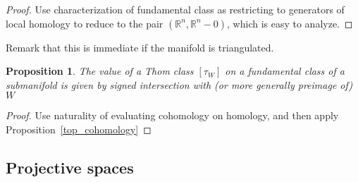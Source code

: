 \documentclass{amsart}          %
\newtheorem{proposition}[theorem]{Proposition}
\newcommand{\R}{\mathbb R}
\begin{document}
\begin{proof}
Use characterization of fundamental class as restricting to generators of local homology to reduce to the pair $(\R^n, \R^n - 0)$,
which is easy to analyze.
\end{proof}

Remark that this is immediate if the manifold is triangulated.

\begin{proposition}
The value of a Thom class $[\tau_W]$ on  a fundamental class of a submanifold is given by signed intersection with 
(or more generally preimage of) $W$
\end{proposition}

\begin{proof}
Use naturality of evaluating cohomology on homology, and then apply Proposition~\ref{top_cohomology}
\end{proof}


\subsection{Projective spaces}
\end{document}

